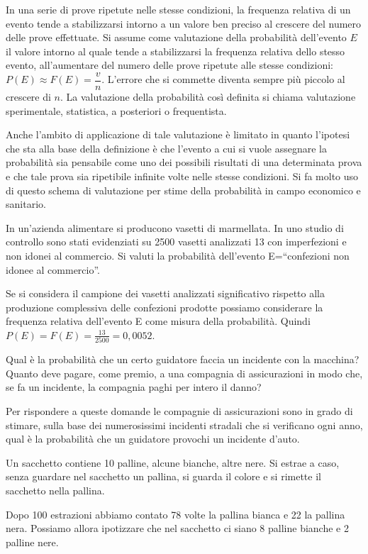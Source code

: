 In una serie di prove ripetute nelle stesse condizioni, la frequenza relativa 
di 
un evento tende a stabilizzarsi intorno a un valore ben preciso al crescere 
del 
numero delle prove effettuate.
Si assume come valutazione della probabilità dell'evento $E$ il valore 
intorno 
al quale tende a stabilizzarsi la frequenza relativa dello stesso evento, 
all'aumentare del numero delle prove ripetute alle stesse condizioni: 
$P(E)\approx F(E)=\dfrac v n$.
L'errore che si commette diventa sempre più piccolo al crescere di $n$. La 
valutazione della probabilità così definita si chiama valutazione 
sperimentale, 
statistica, a posteriori o frequentista.

Anche l'ambito di applicazione di tale valutazione è limitato in quanto 
l'ipotesi che sta alla base della definizione è che l'evento a cui si vuole 
assegnare la probabilità sia pensabile come uno dei possibili risultati di 
una 
determinata prova e che tale prova sia ripetibile infinite volte nelle stesse 
condizioni.
Si fa molto uso di questo schema di valutazione per stime della probabilità 
in 
campo economico e sanitario.

\begin{esempio}
In un'azienda alimentare si producono vasetti di marmellata. In uno studio di 
controllo sono stati evidenziati su 2500 vasetti analizzati 13 con 
imperfezioni 
e non idonei al commercio. Si valuti la probabilità dell'evento 
E=``confezioni 
non idonee al commercio''.

Se si considera il campione dei vasetti analizzati significativo rispetto 
alla 
produzione complessiva delle confezioni prodotte possiamo considerare la 
frequenza relativa dell'evento E come misura della probabilità. Quindi 
$P(E)=F(E)=\frac{13}{2500}=0,0052$.
\end{esempio}

\begin{esempio}
Qual è la probabilità che un certo guidatore faccia un incidente con la 
macchina? Quanto deve pagare, come premio, a una compagnia di assicurazioni 
in 
modo che, se fa un incidente, la compagnia paghi per intero il danno?

Per rispondere a queste domande le compagnie di assicurazioni sono in grado 
di 
stimare, sulla base dei numerosissimi incidenti stradali che si verificano 
ogni 
anno, qual è la probabilità che un guidatore provochi un incidente d'auto.
\end{esempio}

\begin{esempio}
Un sacchetto contiene 10 palline, alcune bianche, altre nere. Si estrae a 
caso, 
senza guardare nel sacchetto un pallina, si guarda il colore e si rimette il 
sacchetto nella pallina.

Dopo 100 estrazioni abbiamo contato 78 volte la pallina bianca e 22 la 
pallina 
nera. Possiamo allora ipotizzare che nel sacchetto ci siano 8 palline bianche 
e 
2 palline nere.
\end{esempio}

